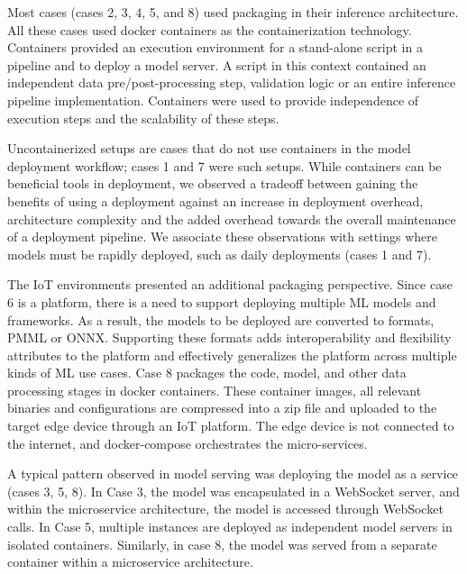 Most cases (cases 2, 3, 4, 5, and 8) used \DIFdelbegin {}\DIFdelend \DIFaddbegin {}\DIFaddend packaging in their inference architecture. All these cases used docker containers as the containerization technology. Containers provided an execution environment for a stand-alone script in a pipeline and to deploy a model server. A script in this context contained an independent data pre/post-processing step, validation logic or an entire inference pipeline implementation. Containers were used to provide independence of execution steps and the scalability of these steps.

Uncontainerized setups are cases that do not use containers in the model deployment workflow; cases 1 and 7 were such setups. While containers can be beneficial tools in deployment, we observed a tradeoff between gaining the benefits of using a \DIFdelbegin {}\DIFdelend \DIFaddbegin {}\DIFaddend deployment against an increase in deployment overhead, architecture complexity and the added overhead towards the overall maintenance of a deployment pipeline. We associate these observations with settings where models must be rapidly deployed, such as daily deployments (cases 1 and 7). %

The IoT environments presented an additional packaging perspective. Since case 6 is a platform, there is a need to support deploying multiple ML models and frameworks. As a result, the models to be deployed are converted to \DIFdelbegin {}\DIFdelend \DIFaddbegin {}\DIFaddend formats, PMML or ONNX. Supporting these formats adds interoperability and flexibility attributes to the platform and effectively generalizes the platform across multiple kinds of ML use cases. Case 8 packages the code, model, and other data processing stages in docker containers. These container images, all relevant binaries and configurations are compressed into a zip file and uploaded to the target edge device through an IoT platform. The edge device is not connected to the internet, and docker-compose orchestrates the micro-services.


A typical pattern observed in model serving was deploying the model as a service (cases 3, 5, 8). In Case 3, the model was encapsulated in a WebSocket server, and within the microservice architecture, the model is accessed through WebSocket calls. In Case 5, multiple instances are deployed as independent model servers in isolated containers. Similarly, in case 8, the model was served from a separate container within a microservice architecture.

